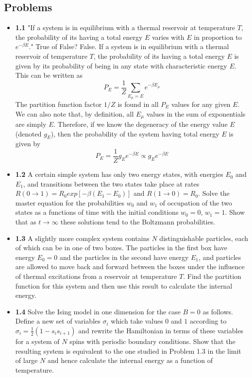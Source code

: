 \documentclass{article}
\begin{document}
\subsection{Problems}
\begin{itemize}
\item \textbf{1.1} "If a system is in equilibrium with a thermal reservoir at temperature $T$, the probability
of its having a total energy $E$ varies with $E$ in proportion to $e^{-\beta E}.$" True of False?
{\color{red} False. If a system is in equilibrium with a thermal reservoir of temperature $T$, the
probability of its having a total energy $E$ is given by its probability of being in any state with characteristic
energy $E$. This can be written as
$$P_{E} = \frac{1}{Z}\sum_{E_{\mu} = E}e^{-\beta E_{\mu}}$$
The partition function factor $1/Z$ is found in all $P_{E}$ values for any given $E$. We can also note that,
by definition, all $E_{\mu}$ values in the sum of exponentials are simply $E$. Therefore, if we know the degeneracy
of the energy value $E$ (denoted $g_{E}$), then the probability of the system having total energy $E$ is given by
$$P_{E} = \frac{1}{Z}g_{E}e^{-\beta E} \propto g_{E}e^{-\beta E}$$
}
\item \textbf{1.2} A certain simple system has only two energy states, with energies $E_{0}$ and $E_{1}$, and
transitions between the two states take place at rates $R(0 \rightarrow 1) = R_{0}exp[-\beta (E_{1} - E_{0})]$
and $R(1 \rightarrow 0) = R_{0}$. Solve the master equation for the probabilities $w_{0}$ and $w_{1}$ of
occupation of the two states as a functions of time with the initial conditions $w_{0} = 0$, $w_{1} = 1$.
Show that as $t \rightarrow \infty$ these solutions tend to the Boltzmann probabilities.
\item \textbf{1.3} A slightly more complex system contains $N$ distinguishable particles, each of which can be in one of two
boxes. The particles in the first box have energy $E_{0} = 0$ and the particles in the second have energy $E_{1}$, and
particles are allowed to move back and forward between the boxes under the influence of thermal excitations from a
reservoir at temperature $T$. Find the partition function for this system and then use this result to calculate the internal
energy.
\item \textbf{1.4} Solve the Ising model in one dimension for the case $B = 0$ as follows. Define a new set
of variables $\sigma_{i}$ which take values $0$ and $1$ according to
$\sigma_{i} = \frac{1}{2}(1 - s_{i}s_{i+1})$ and rewrite the Hamiltonian in terms of these
variables for a system of $N$ spins with periodic boundary conditions. Show that the resulting system is
equivalent to the one studied in Problem 1.3 in the limit of large $N$ and hence calculate the internal
energy as a function of temperature.
\end{itemize}
\end{document}

